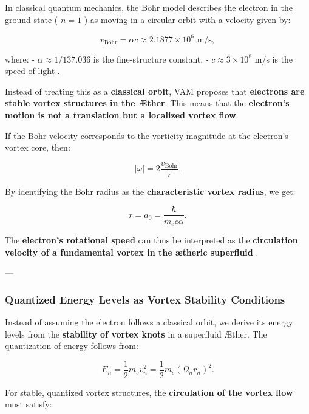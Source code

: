 In classical quantum mechanics, the Bohr model describes the electron in the ground state ( \( n = 1 \) ) as moving in a circular orbit with a velocity given by:

\begin{equation*}
    v_\text{Bohr} = \alpha c \approx 2.1877 \times 10^6 \text{ m/s},
\end{equation*}

where:
- \( \alpha \approx 1/137.036 \) is the fine-structure constant,
- \( c \approx 3 \times 10^8 \) m/s is the speed of light \cite{bohr_atom, bethe_qmech}.

Instead of treating this as a \textbf{classical orbit}, VAM proposes that \textbf{electrons are stable vortex structures in the Æther}. This means that the \textbf{electron's motion is not a translation but a localized vortex flow}.

If the Bohr velocity corresponds to the vorticity magnitude at the electron's vortex core, then:

\begin{equation*}
    |\omega| = 2 \frac{v_\text{Bohr}}{r}.
\end{equation*}

By identifying the Bohr radius as the \textbf{characteristic vortex radius}, we get:

\begin{equation*}
    r = a_0 = \frac{\hbar}{m_e c \alpha}.
\end{equation*}

The \textbf{electron's rotational speed} can thus be interpreted as the \textbf{circulation velocity of a fundamental vortex in the ætheric superfluid} \cite{onsager_superfluid, feynman_superfluid}.

---

\subsubsection*{Quantized Energy Levels as Vortex Stability Conditions}

Instead of assuming the electron follows a classical orbit, we derive its energy levels from the \textbf{stability of vortex knots} in a superfluid Æther. The quantization of energy follows from:

\begin{equation*}
    E_n = \frac{1}{2} m_e v_n^2 = \frac{1}{2} m_e (\Omega_n r_n)^2.
\end{equation*}

For stable, quantized vortex structures, the \textbf{circulation of the vortex flow} must satisfy:

